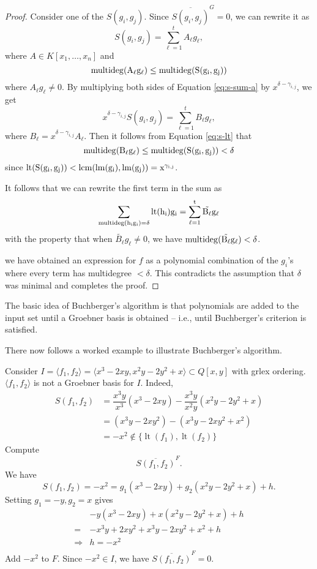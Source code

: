 \documentclass[
]{book}
\theoremstyle{definition}
\theoremstyle{definition}
\theoremstyle{definition}
\theoremstyle{definition}
\theoremstyle{remark}
\begin{document}
\begin{proof}
Consider one of the \(S(g_i,g_j)\). Since \(\overline{S(g_i,g_j)}^G = 0\), we can rewrite it as
\begin{equation}
\label{eq:s-sum-a}
S(g_i,g_j) = \sum^t_{\ell = 1} A_\ell g_\ell,
\end{equation}
where \(A \in K[x_1,\ldots,x_n]\) and
\begin{equation}
\label{eq:s-lt}
\rm{multideg}(A_\ell g_\ell) \le \rm{multideg}(S(g_i,g_j))
\end{equation}
where \(A_\ell g_\ell \ne 0\).
By multiplying both sides of Equation \eqref{eq:s-sum-a} by \(x^{\delta - \gamma_{i,j}}\), we get
\[
x^{\delta - \gamma_{i,j}}S(g_i,g_j) = \sum^t_{\ell = 1} B_\ell g_\ell,
\]
where \(B_\ell = x^{\delta - \gamma_{i,j}} A_\ell\). Then it follows from Equation \eqref{eq:s-lt} that
\[
\rm{multideg}(B_\ell g_\ell) \le \rm{multideg}(S(g_i,g_j)) < \delta
\]
since \(\rm{lt}(S(g_i,g_j)) < \rm{lcm}(\rm{lm}(g_i), \rm{lm}(g_j)) = x^{\gamma_{i,j}}\).

It follows that we can rewrite the first term in the sum as
\[
\sum_{\rm{multideg}(h_i g_i) = \delta} \rm{lt}(h_i) g_i = \sum^t_{\ell = 1} \tilde{B_\ell} g_\ell
\]
with the property that when \(\tilde{B_\ell}g_\ell \ne 0\), we have \(\rm{multideg}(\tilde{B_\ell} g_\ell) < \delta\).

we have obtained an expression for \(f\) as a polynomial combination of the \(g_i\)'s where every term has multidegree \(< \delta\). This contradicts the assumption that \(\delta\) was minimal and completes the proof.
\end{proof}

The basic idea of Buchberger's algorithm is that polynomials are added to the input set until a Groebner basis is obtained -- i.e., until Buchberger's criterion is satisfied.

There now follows a worked example to illustrate Buchberger's algorithm.

Consider \(I = \langle f_1, f_2 \rangle = \langle x^3 - 2xy, x^2 y - 2y^2 + x \rangle \subset Q[x,y]\) with grlex ordering.
\(\langle f_1, f_2 \rangle\) is not a Groebner basis for \(I\).
Indeed,
\begin{align*}
S(f_1,f_2) &= \dfrac{x^{3}y}{x^{3}}\left(x^{3}-2xy\right)-\dfrac{x^{3}y}{x^{2}y}\left(x^{2}y-2y^{2}+x\right) \\
&= \left(x^{3}y-2xy^{2}\right)-\left(x^{3}y-2xy^{2}+x^{2}\right)\\
&= -x^2 \not \in \{\operatorname{lt}(f_1), \operatorname{lt}(f_2)\}
\end{align*}
Compute \[
\overline{ S(f_1,f_2) }^F.
\]
We have
\[
S\left(f_{1},f_{2}\right)=-x^{2}=g_{1}\left(x^{3}-2xy\right)+g_{2}\left(x^{2}y-2y^{2}+x\right)+h.
\]
Setting \(g_1 = -y,g_2 = x\) gives
\begin{align*}
&-y\left(x^{3}-2xy\right)+x\left(x^{2}y-2y^{2}+x\right) + h\\
=&-x^{3}y+2xy^{2}+x^{3}y-2xy^{2}+x^{2} + h\\
\Rightarrow& h = -x^2\\
\end{align*}
Add \(-x^2\) to \(F\).
Since \(-x^2 \in I\), we have \(\overline{S(f_1,f_2)}^F = 0\).
\end{document}
